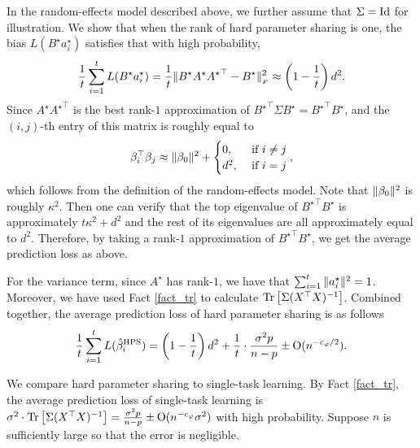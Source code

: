 \begin{example}\label{ex_same_cov}
In the random-effects model described above, we further assume that $\Sigma=\operatorname{Id}$ for illustration. We show that when the rank of hard parameter sharing is one, the bias $L(B^{\star} a_i^{\star})$ satisfies that with high probability, 
\[ \frac{1}{t} \sum_{i=1}^t L(B^{\star} a_i^{\star}) = \frac{1}{t}\|B^{\star} A^{\star} {A^{\star}}^{\top} - B^{\star}\|_{_{F}}^2 \approx \left(1 - \frac{1}{t}\right) {d^2}{}  . \]
Since $A^{\star} {A^{\star}}^{\top}$ is the best rank-$1$ approximation of ${B^{\star}}^{\top}\Sigma B^{\star} = {B^{\star}}^{\top} B^{\star}$, and the $(i, j)$-th entry of this matrix is roughly equal to
\begin{align*}
	\beta_i^{\top} \beta_j \approx \|\beta_0\|^2 + \begin{cases}
																								0, &\text{ if } i \neq j \\
																								d^2, &\text{ if } i = j
	\end{cases},
\end{align*}
which follows from the definition of the random-effects model.
Note that $\|\beta_0\|^2$ is roughly $\kappa^2$.
Then one can verify that the top eigenvalue of ${B^{\star}}^{\top} B^{\star}$ is approximately $t \kappa^2 + d^2$ and the rest of its eigenvalues are all approximately equal to $d^2$.
Therefore, by taking a rank-$1$ approximation of ${B^{\star}}^{\top} B^{\star}$, we get the average prediction loss as above.

For the variance term, since $A^{\star}$ has rank-$1$, we have that $\sum_{i=1}^t \|a_i^{\star}\|^2 = 1$. Moreover, we have used Fact \ref{fact_tr} to calculate $\operatorname{Tr}\left[\Sigma (X^{\top} X)^{-1}\right]$. 
Combined together, the average prediction loss of hard parameter sharing is as follows
\[ \frac{1}{t}\sum_{i=1}^t L(\hat{\beta}_i^{\textup{HPS}}) = \left({1 - \frac{1}{t}}\right) {d^2}{} + \frac{1}{t} \cdot \frac{\sigma^2 p}{n - p} \pm \operatorname{O}(n^{-c_{\varphi} / 2}) .\] %
\end{example}
We compare hard parameter sharing to single-task learning.
By Fact \ref{fact_tr}, the average prediction loss of single-task learning is $\sigma^2\cdot \operatorname{Tr}\left[\Sigma (X^{\top} X)^{-1}\right] = \frac{\sigma^2 p}{n - p}  \pm \operatorname{O}(n^{-c_\varphi} \sigma^2)$ with high probability.
	Suppose $n$ is sufficiently large so that the error is negligible.

